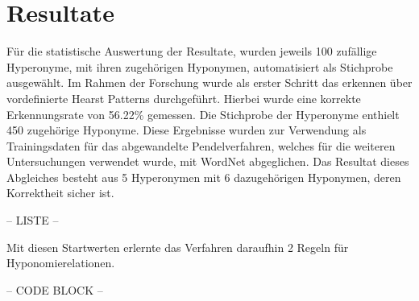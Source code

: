 \section{Resultate}%
Für die statistische Auswertung der Resultate, wurden jeweils 100
zufällige Hyperonyme, mit ihren zugehörigen Hyponymen, automatisiert
als Stichprobe ausgewählt.
Im Rahmen der Forschung wurde als erster Schritt das erkennen über
vordefinierte Hearst Patterns durchgeführt. Hierbei wurde eine 
korrekte Erkennungsrate von 56.22\% gemessen. Die Stichprobe der 
Hyperonyme enthielt 450 zugehörige Hyponyme.
Diese Ergebnisse wurden zur Verwendung als Trainingsdaten für das 
abgewandelte Pendelverfahren, welches für die weiteren Untersuchungen
verwendet wurde, mit WordNet abgeglichen. Das Resultat dieses Abgleiches
besteht aus 5 Hyperonymen mit 6 dazugehörigen Hyponymen, deren Korrektheit
sicher ist. 

-- LISTE --

Mit diesen Startwerten erlernte das Verfahren daraufhin 2 Regeln für
Hyponomierelationen. 

-- CODE BLOCK --

